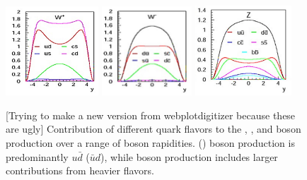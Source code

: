 \begin{figure}[htbp]
\centering
\includegraphics[width=0.31\textwidth]{plots/SM/rapidity_Wp.JPG}
\includegraphics[width=0.30\textwidth]{plots/SM/rapidity_Wm.JPG}
\includegraphics[width=0.32\textwidth]{plots/SM/rapidity_Z.JPG}
\caption{[Trying to make a new version from webplotdigitizer because these are ugly] Contribution of different quark flavors to the \Wp, \Wm, and \Z boson production over a range of boson rapidities. \Wp (\Wm) boson production is predominantly $u\bar{d}$ ($\bar{u}d$), while \Z boson production includes larger contributions from heavier flavors.}
\label{fig:wz_rapidity}
\end{figure}